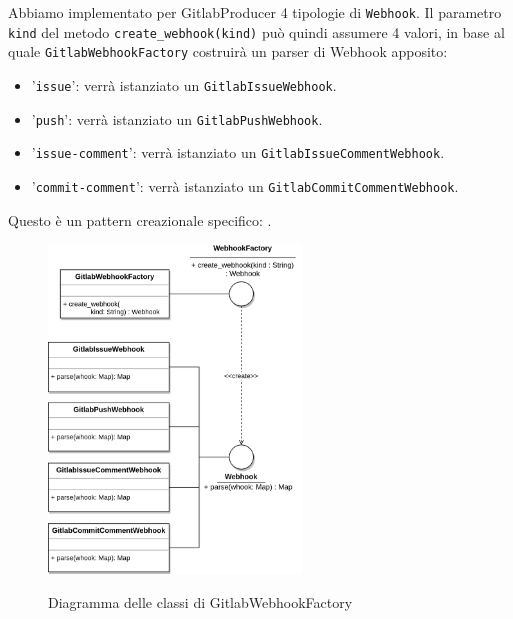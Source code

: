 Abbiamo implementato per GitlabProducer 4 tipologie di \texttt{Webhook}.
Il parametro \texttt{kind} del metodo \texttt{create\_webhook(kind)} può quindi assumere 4 valori, in base al quale
\texttt{GitlabWebhookFactory} costruirà un parser di Webhook apposito:
\begin{itemize}
    \item '\texttt{issue}': verrà istanziato un \texttt{GitlabIssueWebhook}.
    \item '\texttt{push}': verrà istanziato un \texttt{GitlabPushWebhook}.
    \item '\texttt{issue-comment}': verrà istanziato un \texttt{GitlabIssueCommentWebhook}.
    \item '\texttt{commit-comment}': verrà istanziato un \texttt{GitlabCommitCommentWebhook}.
\end{itemize}

Questo è un pattern creazionale specifico: .


\begin{figure}[H]
    \centering
    \includegraphics[width=0.6\textwidth]{img/Producers-GitlabWebhook.png}\\
    \caption{Diagramma delle classi di GitlabWebhookFactory}
\end{figure}



